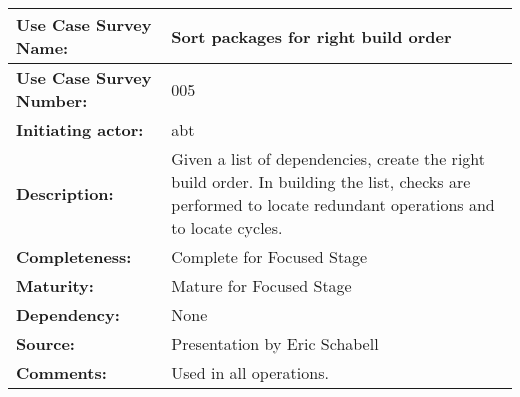 \begin{tabularx}{\linewidth}{|l|X|}
\hline
\textbf{Use Case Survey Name:} & \textbf{Sort packages for right build order} \\
\hline
\textbf{Use Case Survey Number:} & 005 \\
\hline
\textbf{Initiating actor:} & abt \\
\hline
\textbf{Description:} & Given a list of dependencies, create the right build order. In building the list, checks are performed to locate redundant operations and to locate cycles.\\
\hline
\textbf{Completeness:} & Complete for Focused Stage \\
\hline
\textbf{Maturity:} & Mature for Focused Stage \\
\hline
\textbf{Dependency:} & None\\
\hline
\textbf{Source:} & Presentation by Eric Schabell \\
\hline
\textbf{Comments:} & Used in all operations. \\
\hline
\end{tabularx}


 